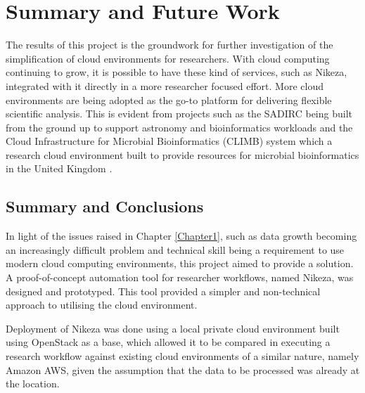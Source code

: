 
\chapter{Summary and Future Work} %

\label{Chapter5} %

The results of this project is the groundwork for further investigation of the simplification of cloud environments for researchers. With cloud computing continuing to grow, it is possible to have these kind of services, such as Nikeza, integrated with it directly in a more researcher focused effort. More cloud environments are being adopted as the go-to platform for delivering flexible scientific analysis. This is evident from projects such as the SADIRC being built from the ground up to support astronomy and bioinformatics workloads and the Cloud Infrastructure for Microbial Bioinformatics (CLIMB) system which a research cloud environment built to provide resources for microbial bioinformatics in the United Kingdom \parencite{connor2016climb}.

\section{Summary and Conclusions}

In light of the issues raised in Chapter \ref{Chapter1}, such as data growth becoming an increasingly difficult problem and technical skill being a requirement to use modern cloud computing environments, this project aimed to provide a solution. A proof-of-concept automation tool for researcher workflows, named Nikeza, was designed and prototyped. This tool provided a simpler and non-technical approach to utilising the cloud environment.

Deployment of Nikeza was done using a local private cloud environment built using OpenStack as a base, which allowed it to be compared in executing a research workflow against existing cloud environments of a similar nature, namely Amazon AWS, given the assumption that the data to be processed was already at the location. 

